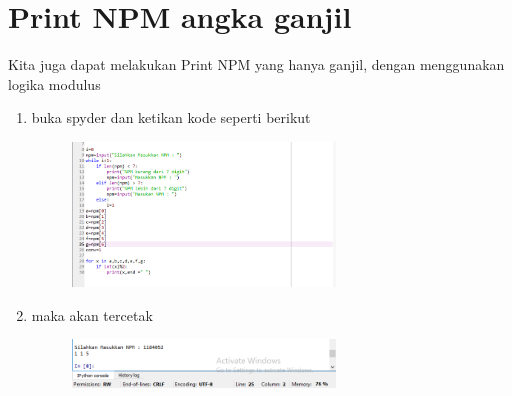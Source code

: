 \chapter*{Print NPM angka ganjil}
\par Kita juga dapat melakukan Print NPM yang hanya ganjil, dengan menggunakan logika modulus

\begin{enumerate}
   

\item buka spyder dan ketikan kode seperti berikut
	\begin{figure} [h]
	\includegraphics[width=7cm]{npm/npm1.png}
	\centering
	\end{figure}
	
	
	
 \item maka akan tercetak 
 \begin{figure} [h]
	\includegraphics[width=7cm]{npm/npm2.png}
	\centering
	\end{figure}
 
	
	\end{enumerate}
